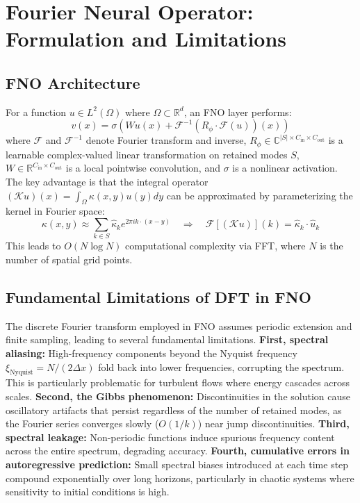 \documentclass[11pt]{article}
\newcommand{\R}{\mathbb{R}}
\newcommand{\C}{\mathbb{C}}
\newcommand{\F}{\mathcal{F}}
\newcommand{\K}{\mathcal{K}}
\begin{document}
\section{Fourier Neural Operator: Formulation and Limitations}

\subsection{FNO Architecture}

For a function $u \in L^2(\Omega)$ where $\Omega \subset \R^d$, an FNO layer performs:
\begin{equation}
v(x) = \sigma \left( W u(x) + \F^{-1}\left( R_\phi \cdot \F(u) \right)(x) \right)
\end{equation}
where $\F$ and $\F^{-1}$ denote Fourier transform and inverse, $R_\phi \in \C^{|S| \times C_{\text{in}} \times C_{\text{out}}}$ is a learnable complex-valued linear transformation on retained modes $S$, $W \in \R^{C_{\text{in}} \times C_{\text{out}}}$ is a local pointwise convolution, and $\sigma$ is a nonlinear activation. The key advantage is that the integral operator $(\K u)(x) = \int_\Omega \kappa(x, y) u(y) dy$ can be approximated by parameterizing the kernel in Fourier space:
\begin{equation}
\kappa(x, y) \approx \sum_{k \in S} \hat{\kappa}_k e^{2\pi i k \cdot (x-y)} \quad \Rightarrow \quad \F[(\K u)](k) = \hat{\kappa}_k \cdot \hat{u}_k
\end{equation}
This leads to $O(N \log N)$ computational complexity via FFT, where $N$ is the number of spatial grid points.

\subsection{Fundamental Limitations of DFT in FNO}

The discrete Fourier transform employed in FNO assumes periodic extension and finite sampling, leading to several fundamental limitations. \textbf{First, spectral aliasing:} High-frequency components beyond the Nyquist frequency $\xi_{\text{Nyquist}} = N/(2\Delta x)$ fold back into lower frequencies, corrupting the spectrum. This is particularly problematic for turbulent flows where energy cascades across scales. \textbf{Second, the Gibbs phenomenon:} Discontinuities in the solution cause oscillatory artifacts that persist regardless of the number of retained modes, as the Fourier series converges slowly ($O(1/k)$) near jump discontinuities. \textbf{Third, spectral leakage:} Non-periodic functions induce spurious frequency content across the entire spectrum, degrading accuracy. \textbf{Fourth, cumulative errors in autoregressive prediction:} Small spectral biases introduced at each time step compound exponentially over long horizons, particularly in chaotic systems where sensitivity to initial conditions is high.
\end{document}
